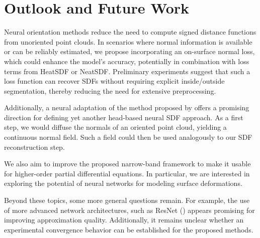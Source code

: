 \documentclass[draft,12pt,openany]{book}
\theoremstyle{plainnormal}
\theoremstyle{remark}
\begin{document}
\section{Outlook and Future Work}
Neural orientation methods reduce the need to compute signed distance functions from unoriented point clouds. In scenarios where normal information is available or can be reliably estimated, we propose incorporating an on-surface normal loss, which could enhance the model's accuracy, potentially in combination with loss terms from HeatSDF or NeatSDF. Preliminary experiments suggest that such a loss function can recover SDFs without requiring explicit inside/outside segmentation, thereby reducing the need for extensive preprocessing.\par
Additionally, a neural adaptation of the method proposed by \cite{FengCrane} offers a promising direction for defining yet another head-based neural SDF approach. As a first step, we would diffuse the normals of an oriented point cloud, yielding a continuous normal field. Such a field could then be used analogously to our SDF reconstruction step.\par
We also aim to improve the proposed narrow-band framework to make it usable for higher-order partial differential equations. In particular, we are interested in exploring the potential of neural networks for modeling surface deformations.\par
Beyond these topics, some more general questions remain. For example, the use of more advanced network architectures, such as ResNet (\cite{he2015deepresiduallearningimage}) appears promising for improving approximation quality. Additionally, it remains unclear whether an experimental convergence behavior can be established for the proposed methods.
\endgroup

\appendix
\end{document}
